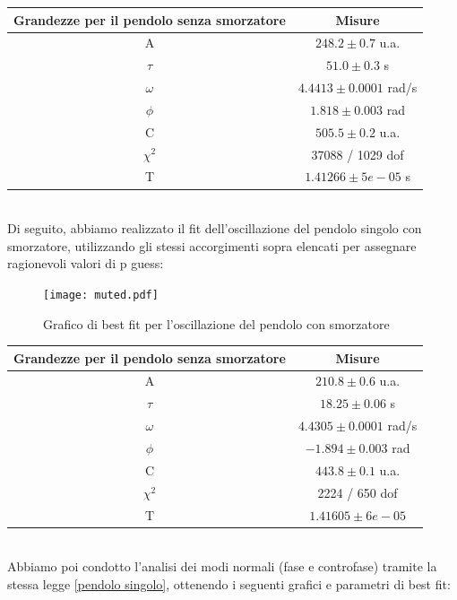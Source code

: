 \documentclass{article}
\begin{document}
\begin{center}
\begin{tabular}{cc}
    \toprule
    Grandezze per il pendolo senza smorzatore & Misure \\
     \midrule
    A & $248.2 \pm 0.7$ u.a.\\
    $\tau$ & $51.0 \pm 0.3$ s\\
    $\omega$ & $4.4413 \pm 0.0001$ rad/s\\
    $\phi$ & $1.818 \pm 0.003$ rad\\
    C & $505.5 \pm 0.2$ u.a.\\
    $\chi^2$ & 37088 / 1029 dof\\
    T & $1.41266 \pm 5e-05$ s \\
    \bottomrule
\end{tabular}
\end{center}
\\
\vspace{1em}
Di seguito, abbiamo realizzato il fit dell'oscillazione del pendolo singolo con smorzatore, utilizzando gli stessi accorgimenti sopra elencati per assegnare ragionevoli valori di p guess:

\begin{figure} [H]
    \centering
    \texttt{[image: muted.pdf]}
    \caption{Grafico di best fit per l'oscillazione del pendolo con smorzatore}
    \label{fig:my_label}
\end{figure}

\begin{center}
\begin{tabular}{cc}
    \toprule
    Grandezze per il pendolo senza smorzatore & Misure \\
     \midrule
    A & $210.8 \pm 0.6$ u.a.\\
    $\tau$ & $18.25 \pm 0.06$ s\\
    $\omega$ & $4.4305 \pm 0.0001$ rad/s\\
    $\phi$ & $-1.894 \pm 0.003$ rad\\
    C & $443.8 \pm 0.1$ u.a.\\
    $\chi^2$ & 2224 / 650 dof\\
    T & $1.41605 \pm 6e-05$ \\
    \bottomrule
\end{tabular}
\end{center}
\\
\vspace{1em}
Abbiamo poi condotto l'analisi dei modi normali (fase e controfase) tramite la stessa legge \eqref{pendolo singolo}, ottenendo i seguenti grafici e parametri di best fit:
\end{document}
